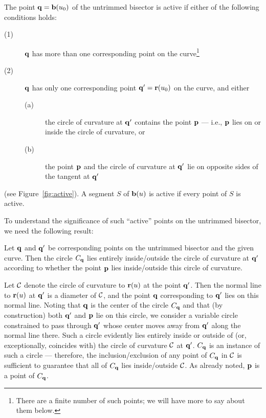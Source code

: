 \begin{dfn}
The point ${\bf q} = {\bf b}(u_{0})$ of the untrimmed bisector is
{\rm active} if either of the following conditions holds:
\begin{description}
\item[{\rm (1)}]
        ${\bf q}$ has more than one corresponding point on the
        curve\footnote{There are a finite number of such points;
        we will have more to say about them below.}
\item[{\rm (2)}]
        ${\bf q}$ has only one corresponding point ${\bf q}' =
        {\bf r}(u_0)$ on the curve, and either
\begin{description}
\item[{\rm (a)}]
        the circle of curvature at ${\bf q}'$ contains the point ${\bf p}$
        --- i.e., ${\bf p}$ lies on or inside the circle of curvature, or
\item[{\rm (b)}]
        the point ${\bf p}$ and the circle of curvature at ${\bf q}'$
        lie on opposite sides of the tangent at ${\bf q'}$
\end{description}
\end{description}
(see Figure~\ref{fig:active}). A segment $S$ of ${\bf b}(u)$ is active
if every point of $S$ is active.
\end{dfn}


To understand the significance of such ``active'' points on the untrimmed
bisector, we need the following result:

\begin{lma} \label{lma:circles}
Let ${\bf q}$ and ${\bf q}'$ be corresponding points on the untrimmed
bisector and the given curve. Then the circle $C_{\bf q}$ lies entirely
inside/outside the circle of curvature at ${\bf q}'$ according to whether
the point ${\bf p}$ lies inside/outside this circle of curvature.
\end{lma}
\prf
Let ${\cal C}$ denote the circle of curvature to ${\bf r}(u)$ at the
point ${\bf q}'$. Then the normal line to ${\bf r}(u)$ at ${\bf q}'$
is a diameter of ${\cal C}$, and the point ${\bf q}$ corresponding
to ${\bf q}'$ lies on this normal line. Noting that ${\bf q}$ is
the center of the circle $C_{\bf q}$ and that (by construction) both
${\bf q}'$ and ${\bf p}$ lie on this circle, we consider a variable
circle constrained to pass through ${\bf q}'$ whose center moves away
from ${\bf q}'$ along the normal line there. Such a circle evidently
lies entirely inside or outside of (or, exceptionally, coincides with)
the circle of curvature ${\cal C}$ at ${\bf q}'$. $C_{\bf q}$ is an
instance of such a circle --- therefore, the inclusion/exclusion of
any point of $C_{\bf q}$ in ${\cal C}$ is sufficient to guarantee that
all of $C_{\bf q}$ lies inside/outside ${\cal C}$. As already noted,
${\bf p}$ is a point of $C_{\bf q}$.
\QED

